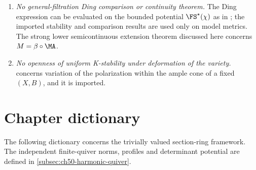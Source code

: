 \begin{enumerate}
      the space of K\"ahler metrics.
\item\label{itm:ch50-nc:ding-filtrations}
      \emph{No general-filtration Ding comparison or continuity theorem.}
      The Ding expression can be evaluated on the bounded potential
      $\FS^\star(\chi)$ as in ; the imported
      stability and comparison results are used only on model metrics.
      The strong lower semicontinuous extension theorem discussed here
      concerns $M=\beta\circ\MA$.
\item\label{itm:ch50-nc:openness}
      \emph{No openness of uniform K-stability under deformation of the
      variety.}   concerns variation of the
      polarization within the ample cone of a fixed $(X,B)$, and it is
      imported.
\end{enumerate}

\section{Chapter dictionary}
\label{sec:ch50-dictionary}

The following dictionary concerns the trivially valued section-ring
framework. The independent finite-quiver norms, profiles and determinant
potential are defined in \cref{subsec:ch50-harmonic-quiver}.

